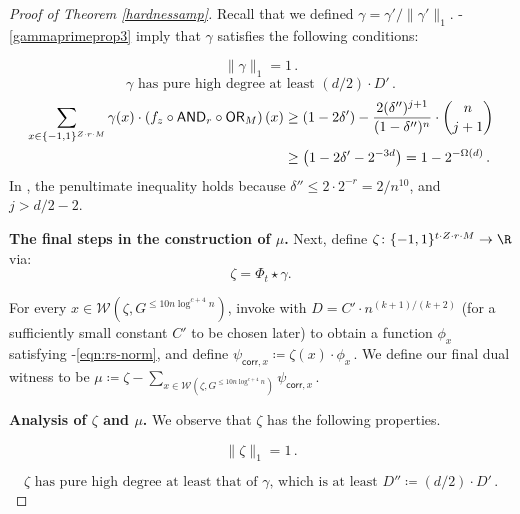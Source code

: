 \documentclass{toc}
\newcommand{\OR}{\mathsf{ OR}}
\newcommand{\bits}{\{-1,1\}}
\newcommand{\ls}{\star}
\newcommand{\AND}{\mathsf{AND}}
\begin{document}
\begin{proof}[Proof of Theorem \ref{hardnessamp}]
	Recall that we defined $\gamma = \gamma'/\|\gamma'\|_1$. -\eqref{gammaprimeprop3} imply that $\gamma$ 
satisfies the following conditions: %
	
	\begin{equation}
	\label{gammaprop1}
	\|\gamma\|_1 = 1\,.
	\end{equation}
	\begin{equation}
	\label{gammaprop2}
	\gamma \text{ has pure high degree at least } (d/2) \cdot D'\,.
	\end{equation}
	\begin{align}
	\sum_{x \in \bits^{Z \cdot r \cdot M}} \gamma(x) \cdot \left(f_z \circ \AND_r \circ \OR_M\right)(x) &\geq 
	(1-2\delta') - \frac{2 (\delta'')^{j+1}}{(1-\delta'')^n} \cdot {n \choose j+1} \notag\\ &\geq 
	\left(1-2\delta' - 2^{-3d}\right) = 1-2^{-\Omega(d)}\,.
	\label{gammaprop3}
	\end{align}
	In , the penultimate inequality holds because $\delta'' \leq 2 \cdot 2^{-r} =2/n^{10}$, and $j > d/2-2$. 
	
	\medskip \noindent \textbf{The final steps in the construction of $\mu$.}
	Next, define $\zeta \colon \bits^{ t \cdot Z \cdot r \cdot M} \to \R$ via:
	$$\zeta = \Phi_t \ls \gamma.$$  
	
	For every $x \in \mathcal{W}\left(\zeta, G^{\leq 10 n \log^{c + 4} n}\right)$, invoke  with $D=C' \cdot n^{(k+1)/(k+2)}$ (for a sufficiently
small constant $C'$ to be chosen later) to obtain a function $\phi_x$
satisfying  -\eqref{eqn:rs-norm}, and
define $\psi_{\mathsf{corr}, x}
\coloneqq %
\zeta(x) \cdot \phi_x$\,.
	We define our final dual witness to be $\mu \coloneqq  \zeta - \sum_{x \in \mathcal{W}\left(\zeta, G^{\leq 10 n \log^{c + 4} n}\right)} \psi_{\mathsf{corr}, x}$\,.
	
\medskip \noindent \textbf{Analysis of $\zeta$ and $\mu$.} %
%
%
%
We observe that $\zeta$ has the following properties.
	
	\begin{equation}\label{zeta2prop1}
	\|\zeta\|_1=1\,.
	\end{equation}
	
	\begin{equation}\label{zeta2prop2}
	\zeta \text{ has pure high degree at least that of } \gamma \text{, which is  at least } D''\coloneqq (d/2) \cdot D'\,.
	\end{equation}
	

\end{proof}
\end{document}
